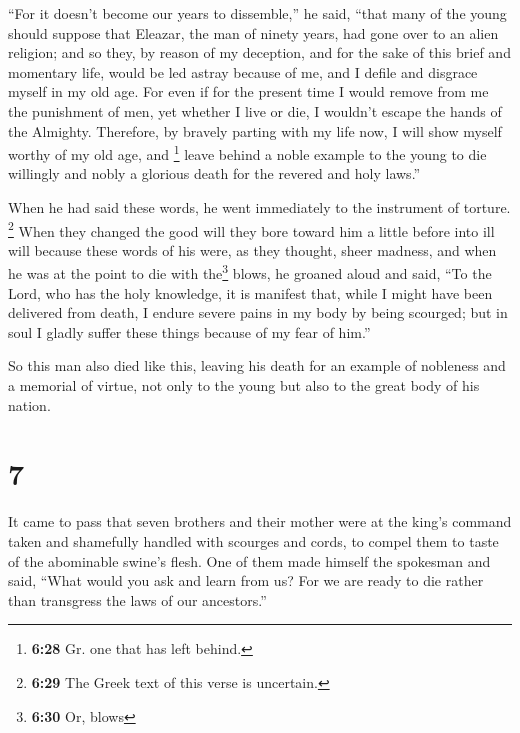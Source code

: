  ``For it doesn't become our years to dissemble,'' he
said, ``that many of the young should suppose that Eleazar, the man of
ninety years, had gone over to an alien religion;  and so
they, by reason of my deception, and for the sake of this brief and
momentary life, would be led astray because of me, and I defile and
disgrace myself in my old age.  For even if for the
present time I would remove from me the punishment of men, yet whether I
live or die, I wouldn't escape the hands of the Almighty.
 Therefore, by bravely parting with my life now, I will
show myself worthy of my old age,  and \footnote{\textbf{6:28}
  Gr. one that has left behind.} leave behind a noble example to the
young to die willingly and nobly a glorious death for the revered and
holy laws.''

When he had said these words, he went immediately to the instrument of
torture.  \footnote{\textbf{6:29} The Greek text of this
  verse is uncertain.} When they changed the good will they bore toward
him a little before into ill will because these words of his were, as
they thought, sheer madness,  and when he was at the
point to die with the\footnote{\textbf{6:30} Or, blows} blows, he
groaned aloud and said, ``To the Lord, who has the holy knowledge, it is
manifest that, while I might have been delivered from death, I endure
severe pains in my body by being scourged; but in soul I gladly suffer
these things because of my fear of him.''

 So this man also died like this, leaving his death for
an example of nobleness and a memorial of virtue, not only to the young
but also to the great body of his nation.

\hypertarget{section-6}{%
\section{7}\label{section-6}}

 It came to pass that seven brothers and their mother were
at the king's command taken and shamefully handled with scourges and
cords, to compel them to taste of the abominable swine's flesh.
 One of them made himself the spokesman and said, ``What
would you ask and learn from us? For we are ready to die rather than
transgress the laws of our ancestors.''

